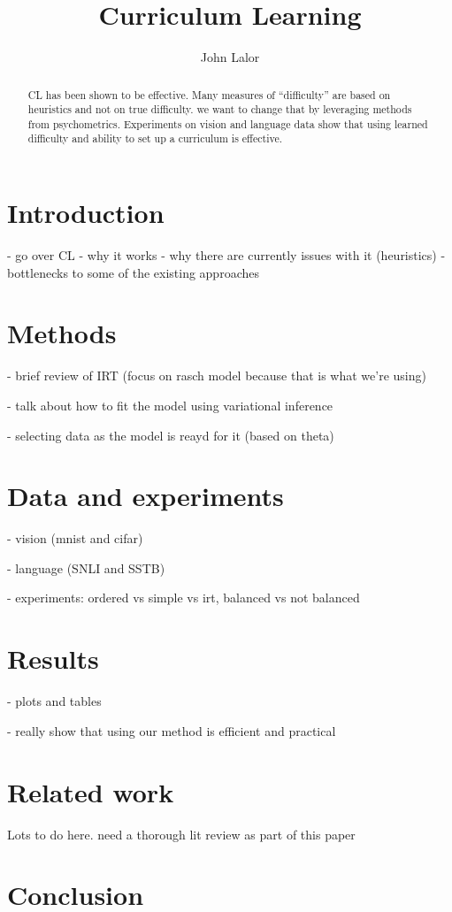 \documentclass{article}
\title{Curriculum Learning}
\author{John Lalor}
\begin{document}
\maketitle 
\begin{abstract}
CL has been shown to be effective.
Many measures of ``difficulty'' are based on heuristics and not on true difficulty.
we want to change that by leveraging methods from psychometrics.
Experiments on vision and language data show that using learned difficulty and ability to set up a curriculum is effective.
\end{abstract}

\section{Introduction}
- go over CL
- why it works
- why there are currently issues with it (heuristics)
- bottlenecks to some of the existing approaches

\section{Methods}

- brief review of IRT (focus on rasch model because that is what we're using)

- talk about how to fit the model using variational inference

- selecting data as the model is reayd for it (based on theta)

\section{Data and experiments} 

- vision (mnist and cifar)

- language (SNLI and SSTB) 

- experiments: ordered vs simple vs irt, balanced vs not balanced 

\section{Results} 

- plots and tables 

- really show that using our method is efficient and practical 

\section{Related work}

Lots to do here. need a thorough lit review as part of this paper 

\section{Conclusion} 
\end{document}
